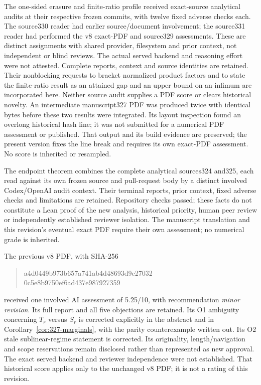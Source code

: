 \documentclass[11pt]{article}
\begin{document}
The one-sided erasure and finite-ratio profile received exact-source
analytical audits at their respective frozen commits, with twelve fixed
adverse checks each. The source330 reader had earlier source/document
involvement; the source331 reader had performed the v8 exact-PDF and
source329 assessments. These are distinct assignments with shared provider,
filesystem and prior context, not independent or blind reviews. The actual
served backend and reasoning effort were not attested. Complete reports,
context and source identities are retained. Their nonblocking requests to
bracket normalized product factors and to state the finite-ratio result as
an attained gap and an upper bound on an infimum are incorporated here.
Neither source audit supplies a PDF score or clears historical novelty.
An intermediate manuscript327 PDF was produced twice with identical bytes
before these two results were integrated. Its layout inspection found an
overlong historical hash line; it was not submitted for a numerical PDF
assessment or published. That output and its build evidence are preserved;
the present version fixes the line break and requires its own exact-PDF
assessment. No score is inherited or resampled.

The endpoint theorem combines the complete analytical sources324 and325,
each read against its own frozen source and pull-request body by a distinct
involved Codex/OpenAI audit context. Their terminal reports, prior context,
fixed adverse checks and limitations are retained. Repository checks passed;
these facts do not constitute a Lean proof of the new analysis, historical
priority, human peer review or independently established reviewer isolation.
The manuscript translation and this revision's eventual exact PDF require
their own assessment; no numerical grade is inherited.

The previous v8 PDF, with SHA-256
\begin{quote}\small\ttfamily
a4d0449b973b657a741ab4d48693d9c27032\\
0c5e8b9750ef6ad437e987927359
\end{quote}
received one involved AI assessment of 5.25/10, with recommendation
\emph{minor revision}. Its full report and all five objections are retained.
Its O1 ambiguity concerning $T_r$ versus $S_r$ is corrected explicitly in
the abstract and in Corollary~\ref{cor:327-marginals}, with the parity
counterexample written out. Its O2 stale sublinear-regime statement is
corrected. Its originality, length/navigation and scope reservations remain
disclosed rather than represented as new approval. The exact served backend
and reviewer independence were not established. That historical score applies
only to the unchanged v8 PDF; it is not a rating of this revision.
\end{document}
